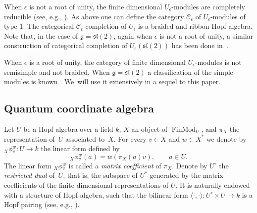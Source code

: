 \documentclass[pdftex]{sigma}%
\numberwithin{equation}{section}
\numberwithin{figure}{section}
\newcommand{\ra}{\rightarrow}
\begin{document}
When $\epsilon$ is not a root of unity, the finite dimensional $U_\epsilon$-modules are completely reducible (see, e.g., \cite[Theorem~10.1.14]{CP}). As above one can define the category ${\mathcal C}_\epsilon$ of $U_\epsilon$-modules of type $1$. The categorical ${\mathcal C}_\epsilon$-completion of $U_\epsilon$ is a braided and ribbon Hopf algebra. Note that, in the case of ${\mathfrak g }={\mathfrak{sl}}(2)$, again when $\epsilon$ is not a root of unity, a similar construction of categorical completion of $U_\epsilon({\mathfrak{sl}}(2))$ has been done in~\cite{FK}.

When $\epsilon$ is a root of unity, the category of finite dimensional $U_\epsilon$-modules is not semisimple and not braided. When ${\mathfrak g}={\mathfrak{sl}}(2)$ a classification of the simple modules is known \cite{DC-K, RA}. We~will use it extensively in a sequel to this paper.

\subsection{Quantum coordinate algebra}\label{OQ} Let $U$ be a Hopf algebra over a field $k$, $X$ an object of $\operatorname{FinMod}_U$, and $\pi_X$ the representation of~$U$ associated to~$X$. For every $v\in X$ and $w\in X^*$ we denote by ${}_X\phi{}^w_v\colon U \ra k$ the linear form defined by
\begin{equation*}%
{}_X\phi{}^w_v(a) = w(\pi_X(a)v), \qquad a\in U.
\end{equation*}
The linear form ${}_X\phi{}^w_v$ is called a {\it matrix coefficient} of $\pi_X$. Denote by $U^\circ$ the {\it restricted dual} of~$U$, that is, the subspace of $U^*$ generated by the matrix coefficients of the finite dimensional representations of $U$. It is naturally endowed with a structure of Hopf algebra, such that the bilinear form $\langle\cdot,\cdot\rangle \colon U^\circ \times U \ra k$ is a Hopf pairing (see, e.g., \cite[Chapter~4]{CP}).
\end{document}

